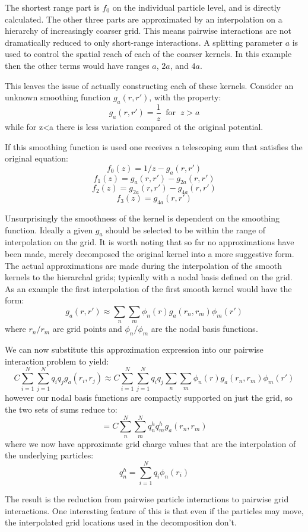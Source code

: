 \documentclass[review]{siamart}
\newcommand{\be}{\begin{equation}}
\newcommand{\ee}{\end{equation}}
\begin{document}
The shortest range part is $f_0$ on the individual particle level, and is directly calculated. The other three parts are approximated by an interpolation on a hierarchy of increasingly coarser grid. This means pairwise interactions are not dramatically reduced to only short-range interactions. A splitting parameter $a$ is used to control the spatial reach of each of the coarser kernels. In this example then the other terms would have ranges $a$, $2a$, and $4a$.

This leaves the issue of actually constructing each of these kernels. Consider an unknown smoothing function $g_a(r,r')$, with the property:
\be g_a(r,r') = \frac{1}{z} \;\; \text{for} \;\; z>a \ee
while for z<a there is less variation compared ot the original potential.

If this smoothing function is used one receives a telescoping sum that satisfies the original equation:
\be f_0(z) = 1/z - g_a(r,r') \ee
\be f_1(z) = g_a(r,r')-g_{2a}(r,r') \ee
\be f_2(z) = g_{2a}(r,r')-g_{4a}(r,r') \ee
\be f_3(z) = g_{4a}(r,r') \ee

Unsurprisingly the smoothness of the kernel is dependent on the smoothing function. Ideally a given $g_a$ should be selected to be within the range of interpolation on the grid. It is worth noting that so far no approximations have been made, merely decomposed the original kernel into a more suggestive form. The actual approximations are made during the interpolation of the smooth kernels to the hierarchal grids; typically with a nodal basis defined on the grid. As an example the first interpolation of the first smooth kernel would have the form:
\be g_a(r,r') \approx \sum_n \sum_m \phi_n(r) g_a(r_n,r_m) \phi_m(r') \ee
where $r_n / r_m$ are grid points and $\phi_n/\phi_m$ are the nodal basis functions.

We can now substitute this approximation expression into our pairwise interaction problem to yield:
\be C \sum_{i=1}^N \sum_{j=1}^N q_i q_j g_a(r_i,r_j) \approx C \sum_{i=1}^N \sum_{j=1}^N q_i q_j\sum_n \sum_m \phi_n(r) g_a(r_n,r_m) \phi_m(r') \ee
however our nodal basis functions are compactly supported on just the grid, so the two sets of sums reduce to:
\be  = C \sum_{n}^N \sum_{m}^N q_n^h q_m^h g_a(r_n,r_m) \ee
where we now have approximate grid charge values that are the interpolation of the underlying particles:
\be q_n^h = \sum_{i=1}^N q_i \phi_n(r_i) \ee

The result is the reduction from pairwise particle interactions to pairwise grid interactions. One interesting feature of this is that even if the particles may move, the interpolated grid locations used in the decomposition don't.
\end{document}
